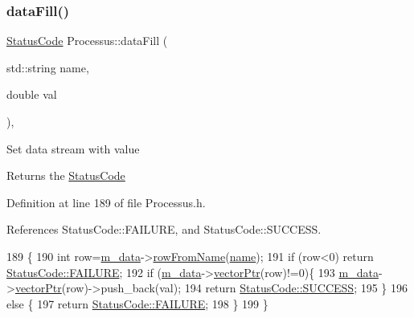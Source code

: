 \subsubsection{\texorpdfstring{data\+Fill()}{dataFill()}\hspace{0.1cm}{\footnotesize\ttfamily [2/2]}}
{\footnotesize\ttfamily \hyperlink{classStatusCode}{Status\+Code} Processus\+::data\+Fill (\begin{DoxyParamCaption}\item[{std\+::string}]{name,  }\item[{double}]{val }\end{DoxyParamCaption})\hspace{0.3cm}{\ttfamily [inline]}, {\ttfamily [inherited]}}

Set data stream with value \begin{DoxyReturn}{Returns}
the \hyperlink{classStatusCode}{Status\+Code} 
\end{DoxyReturn}


Definition at line 189 of file Processus.\+h.



References Status\+Code\+::\+F\+A\+I\+L\+U\+RE, and Status\+Code\+::\+S\+U\+C\+C\+E\+SS.


\begin{DoxyCode}
189                                                  \{
190     \textcolor{keywordtype}{int} row=\hyperlink{classProcessus_a3da9a9de8af54e2f47807a3e09dfccff}{m\_data}->\hyperlink{classData_a72f9afe0edb22ad39871292f9f4d3d38}{rowFromName}(\hyperlink{classObject_a300f4c05dd468c7bb8b3c968868443c1}{name});
191     \textcolor{keywordflow}{if} (row<0) \textcolor{keywordflow}{return} \hyperlink{classStatusCode_a6f565cbeadc76d14c72f047e5e85eb4ba3da73d4c469762eb9d3c960368252b26}{StatusCode::FAILURE};
192     \textcolor{keywordflow}{if} (\hyperlink{classProcessus_a3da9a9de8af54e2f47807a3e09dfccff}{m\_data}->\hyperlink{classData_aa2153cb57f6f1a67b54eafe5582e0b6b}{vectorPtr}(row)!=0)\{
193       \hyperlink{classProcessus_a3da9a9de8af54e2f47807a3e09dfccff}{m\_data}->\hyperlink{classData_aa2153cb57f6f1a67b54eafe5582e0b6b}{vectorPtr}(row)->push\_back(val);
194       \textcolor{keywordflow}{return} \hyperlink{classStatusCode_a6f565cbeadc76d14c72f047e5e85eb4badd0da38d3ba0d922efd1f4619bc37ad8}{StatusCode::SUCCESS};
195     \}
196     \textcolor{keywordflow}{else} \{
197       \textcolor{keywordflow}{return} \hyperlink{classStatusCode_a6f565cbeadc76d14c72f047e5e85eb4ba3da73d4c469762eb9d3c960368252b26}{StatusCode::FAILURE};
198     \}
199   \}
\end{DoxyCode}
\mbox{\label{classAcquisition_a8fb2cd60a34993ab0952d719a8517831}} 
